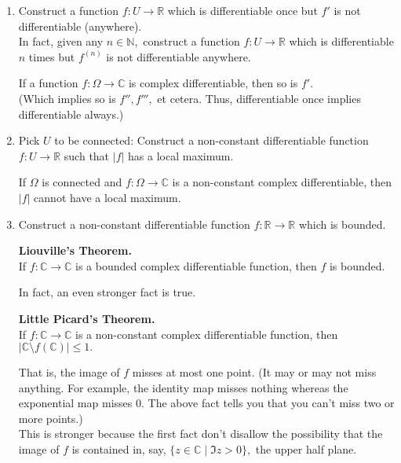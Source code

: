 \documentclass[12pt]{article}
\theoremstyle{definition}
\numberwithin{thm}{section}
\newenvironment{blockquote}
{\begin{mdframed}[skipabove=0pt, skipbelow=0pt, innertopmargin=4pt, innerbottommargin=4pt, bottomline=false,topline=false,rightline=false, linewidth=2pt]}
{\end{mdframed}}
\begin{document}
\begin{enumerate}
	\item Construct a function $f:U \to \mathbb{R}$ which is differentiable once but $f'$ is not differentiable (anywhere).\\
	In fact, given any $n \in \mathbb{N},$ construct a function $f:U\to \mathbb{R}$ which is differentiable $n$ times but $f^{(n)}$ is not differentiable anywhere.\\
	\begin{blockquote}
		If a function $f:\Omega \to \mathbb{C}$ is complex differentiable, then so is $f'.$\\
		(Which implies so is $f'', f''',$ et cetera. Thus, differentiable once implies differentiable always.)
	\end{blockquote}
	\item Pick $U$ to be connected: Construct a non-constant differentiable function $f:U\to \mathbb{R}$ such that $|f|$ has a local maximum. \\
	\begin{blockquote}
		If $\Omega$ is connected and $f:\Omega \to \mathbb{C}$ is a non-constant complex differentiable, then $|f|$ cannot have a local maximum.
	\end{blockquote}
	\item Construct a non-constant differentiable function $f:\mathbb{R} \to \mathbb{R}$ which is bounded.\\
	\begin{blockquote}
		\textbf{Liouville's Theorem.}\\
		If $f:\mathbb{C} \to \mathbb{C}$ is a bounded complex differentiable function, then $f$ is bounded.
	\end{blockquote}
	In fact, an even stronger fact is true.\\
	\begin{blockquote}
		\textbf{Little Picard's Theorem.}\\
		If $f:\mathbb{C} \to \mathbb{C}$ is a non-constant complex differentiable function, then $\left|\mathbb{C}\setminus f(\mathbb{C})\right| \le 1.$
	\end{blockquote}
	That is, the image of $f$ misses at most one point. (It may or may not miss anything. For example, the identity map misses nothing whereas the exponential map misses $0.$ The above fact tells you that you can't miss two or more points.)\\
	This is stronger because the first fact don't disallow the possibility that the image of $f$ is contained in, say, $\{z \in \mathbb{C} \mid \Im z > 0\},$ the upper half plane.

\end{enumerate}
\end{document}
